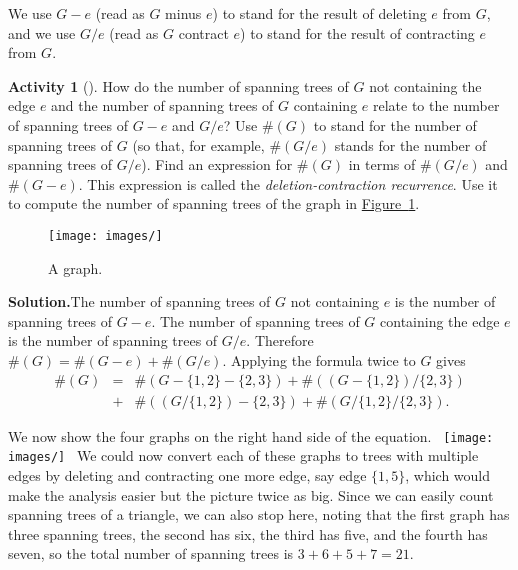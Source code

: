 \documentclass[10pt,]{book}
\theoremstyle{plain}
\theoremstyle{definition}
\newtheorem{activity}[project]{Activity}
\numberwithin{equation}{chapter}
\newcommand{\amp}{&}
\begin{document}
%
\par
We use \(G-e\) (read as \(G\) minus \(e\)) to stand for the result of deleting \(e\) from \(G\), and we use \(G/e\) (read as \(G\) contract \(e\)) to stand for the result of contracting \(e\) from \(G\).%
\begin{activity}[]\label{activity-58}
How do the number of spanning trees of \(G\) not containing the edge \(e\) and the number of spanning trees of \(G\) containing \(e\) relate to the number of spanning trees of \(G-e\) and \(G/e\)? Use \(\#(G)\) to stand for the number of spanning trees of \(G\) (so that, for example, \(\#(G/e)\) stands for the number of spanning trees of \(G/e\)). Find an expression for \(\#(G)\) in terms of \(\#(G/e)\) and \(\#(G-e)\). This expression is called the \emph{deletion-contraction recurrence}. Use it to compute the number of spanning trees of the graph in \hyperref[spantreeexercise]{Figure~\ref{spantreeexercise}}.%
\begin{figure}
\centering
\texttt{[image: images/]}
\caption{A graph.\label{spantreeexercise}}
\end{figure}
\par\medskip\noindent%
\textbf{Solution.}\quad The number of spanning trees of \(G\) not containing \(e\) is the number of spanning trees of \(G-e\). The number of spanning trees of \(G\) containing the edge \(e\) is the number of spanning trees of \(G/e\). Therefore \(\#(G) =\#(G-e)
+\#(G/e)\). Applying the formula twice to \(G\) gives%
\begin{align*}
\#(G)
\amp =\amp \#(G-\{1,2\}-\{2,3\}) + \#((G-\{1,2\})/\{2,3\})\\
\amp +\amp
\#((G/\{1,2\})-\{2,3\}) +
\#(G/\{1,2\}/\{2,3\}).
\end{align*}
%
\par
We now show the four graphs on the right hand side of the equation. \mbox{ \texttt{[image: images/]}
 } We could now convert each of these graphs to trees with multiple edges by deleting and contracting one more edge, say edge \(\{1,5\}\), which would make the analysis easier but the picture twice as big. Since we can easily count spanning trees of a triangle, we can also stop here, noting that the first graph has three spanning trees, the second has six, the third has five, and the fourth has seven, so the total number of spanning trees is \(3+6+5+7=21\).%
\end{activity}
\typeout{************************************************}
\typeout{************************************************}
\end{document}
